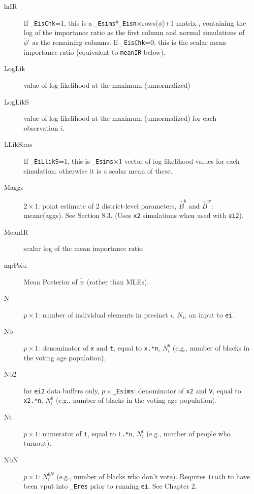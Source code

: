 \documentclass[11pt,titlepage]{article}
\newcommand{\psiu}{\breve{\psi}}
\newcommand{\NbN}{{N_i^{bN}}}
\newcommand{\Nbp}{{N_i^{b}}}
\newcommand{\Npp}{{N_i}}
\begin{document}
\begin{description}
\item[lnIR] If \texttt{\_EisChk}=1, this is a
  \texttt{\_Esims}*\texttt{\_Eisn}$\times$rows($\phi$)+1 matrix ,
  containing the log of the importance ratio as the first column and
  normal simulations of $\tilde{\phi}'$ as the remaining columns.  If
  \texttt{\_EisChk}=0, this is the scalar mean importance ratio
  (equivalent to \texttt{meanIR} below).

\item[LogLik] value of log-likelihood at the maximum (unnormalized)

\item[LogLikS] value of log-likelihood at the maximum (unnormalized)
  for each observation $i$.

\item[LLikSims] If \texttt{\_EiLlikS}=1, this is \texttt{\_Esims}$\times
  1$ vector of log-likelihood values for each simulation; otherwise it
  is a scalar mean of these.

\item[Maggs] $2\times 1$: point estimate of 2 district-level
  parameters, $\hat{B}^b$ and $\hat{B}^w$: meanc(aggs).  See Section
  8.3.  (Uses \texttt{x2} simulations when used with \texttt{ei2}).

\item[MeanIR] scalar log of the mean importance ratio

\item[mpPsiu] Mean Posterior of $\psiu$ (rather than MLEs).

\item[N] $p\times 1$: number of individual elements in precinct $i$,
  $\Npp$, an input to \texttt{ei}.

\item[Nb] $p\times 1$: denominator of \texttt{x} and \texttt{t},
  equal to \texttt{x.*n}, $\Nbp$ (e.g., number of blacks in the
  voting age population).

\item[Nb2] for \texttt{ei2} data buffers only,
  $p\times$\texttt{\_Esims}: denominator of \texttt{x2} and
  \texttt{V}, equal to \texttt{x2.*n}, $\Nbp$ (e.g., number of blacks
  in the voting age population).

\item[Nt] $p\times 1$: numerator of \texttt{t}, equal to
  \texttt{t.*n}, $N^t_i$ (e.g., number of people who turnout).

\item[NbN] $p\times1$: $\NbN$ (e.g., number of blacks who don't vote).
  Requires \texttt{truth} to have been vput into \texttt{\_Eres} prior
  to running \texttt{ei}.  See Chapter 2.


\end{description}
\end{document}
